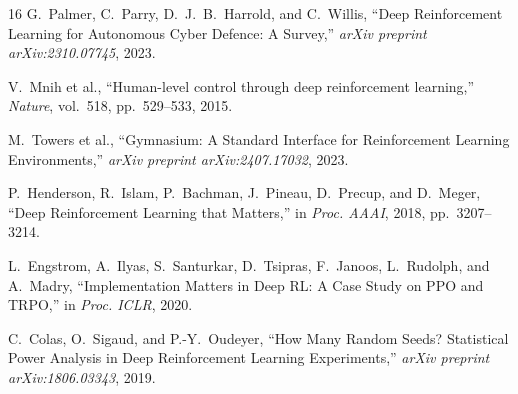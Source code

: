 \documentclass[conference]{IEEEtran}
\begin{document}
\begin{thebibliography}{16}
G.~Palmer, C.~Parry, D.~J.~B.~Harrold, and C.~Willis,
``Deep Reinforcement Learning for Autonomous Cyber Defence: A Survey,''
\emph{arXiv preprint arXiv:2310.07745}, 2023.

V.~Mnih et al.,
``Human-level control through deep reinforcement learning,''
\emph{Nature}, vol.~518, pp.~529--533, 2015.

M.~Towers et al.,
``Gymnasium: A Standard Interface for Reinforcement Learning
Environments,''
\emph{arXiv preprint arXiv:2407.17032}, 2023.

P.~Henderson, R.~Islam, P.~Bachman, J.~Pineau, D.~Precup, and D.~Meger,
``Deep Reinforcement Learning that Matters,''
in \emph{Proc. AAAI}, 2018, pp.~3207--3214.

L.~Engstrom, A.~Ilyas, S.~Santurkar, D.~Tsipras, F.~Janoos,
L.~Rudolph, and A.~Madry,
``Implementation Matters in Deep RL: A Case Study on PPO and TRPO,''
in \emph{Proc. ICLR}, 2020.

C.~Colas, O.~Sigaud, and P.-Y.~Oudeyer,
``How Many Random Seeds? Statistical Power Analysis in Deep
Reinforcement Learning Experiments,''
\emph{arXiv preprint arXiv:1806.03343}, 2019.

\end{thebibliography}
\end{document}
